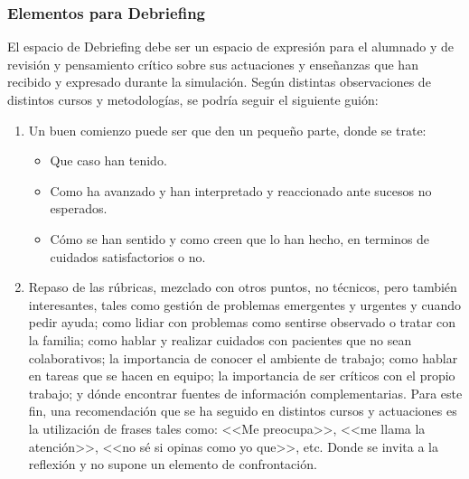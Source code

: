 \subsubsection{Elementos para Debriefing}
El espacio de Debriefing debe ser un espacio de expresión para el alumnado y de revisión y pensamiento crítico sobre sus actuaciones y enseñanzas que han recibido y expresado durante la simulación. Según distintas observaciones de distintos cursos y metodologías, se podría seguir el siguiente guión:
\begin{enumerate}[topsep=0pt, partopsep=0pt,itemsep=0pt,parsep=0pt]
    \item Un buen comienzo puede ser que den un pequeño parte, donde se trate:
    \begin{itemize}[topsep=0pt, partopsep=0pt,itemsep=0pt,parsep=0pt]
        \item Que caso han tenido.
        \item Como ha avanzado y han interpretado y reaccionado ante sucesos no esperados.
        \item Cómo se han sentido y como creen que lo han hecho, en terminos de cuidados satisfactorios o no.
    \end{itemize}
    \item Repaso de las rúbricas, mezclado con otros puntos, no técnicos, pero también interesantes, tales como gestión de problemas emergentes y urgentes y cuando pedir ayuda; como lidiar con problemas como sentirse observado o tratar con la familia; como hablar y realizar cuidados con pacientes que no sean colaborativos; la importancia de conocer el ambiente de trabajo; como hablar en tareas que se hacen en equipo; la importancia de ser críticos con el propio trabajo; y dónde encontrar fuentes de información complementarias.
        \subitem Para este fin, una recomendación que se ha seguido en distintos cursos y actuaciones es la utilización de frases tales como: <<Me preocupa>>, <<me llama la atención>>, <<no sé si opinas como yo que>>, etc. Donde se invita a la reflexión y no supone un elemento de confrontación.
\end{enumerate}




